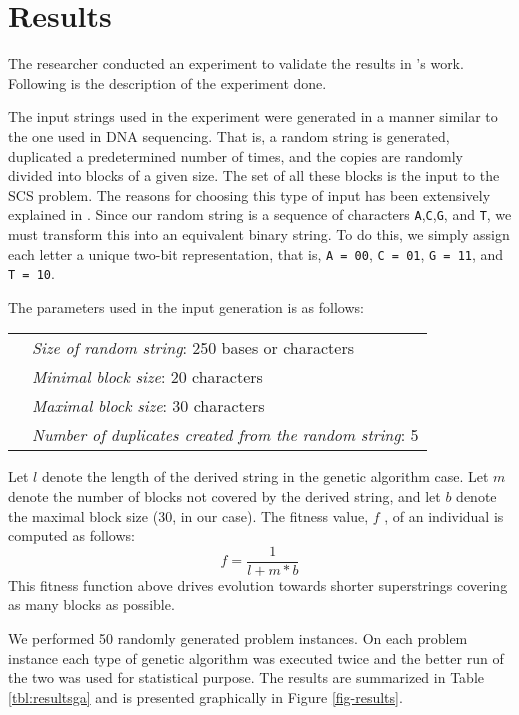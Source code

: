\chapter{Results}

The researcher conducted an experiment to validate the results
in \cite{Zaritsky2004}'s work. Following is the description of the 
experiment done.

The input strings used in the experiment were generated in a
 manner similar to the one used in DNA sequencing. That is, a random
string is generated, duplicated a predetermined number of times,
 and the copies are randomly divided into blocks of a given size. 
 The set of all these blocks is the input to the SCS problem. 
 The reasons for choosing this type of input has been extensively
 explained in \cite{Zaritsky2004}.
Since our random string is a sequence of characters \texttt{A},\texttt{C},\texttt{G}, and \texttt{T}, we must 
transform this into an equivalent binary string. To do this, we simply 
assign each letter a unique two-bit representation, that is, 
\texttt{A = 00}, \texttt{C = 01}, \texttt{G = 11}, and \texttt{T = 10}. 

The parameters used in the input generation is as follows:

\begin{tabular}{p{0.5cm}l}
&\textit{Size of random string}: 250 bases or characters\\
&\textit{Minimal block size}: 20 characters\\
&\textit{Maximal block size}: 30 characters\\
&\textit{Number of duplicates created from the random string}: 5\\
\end{tabular}

Let $l$ denote the length of the derived string in the
genetic algorithm case. Let $m$
denote the number of blocks not covered by the derived string, 
and let $b$ denote the maximal block size
(30, in our case). The fitness value, $f$ , of an individual
is computed as follows:
\[f = \dfrac{1}{l + m*b}\] 
This fitness function above drives evolution towards
shorter superstrings covering as many blocks as possible.

We performed 50 randomly generated problem instances.
On each problem instance each type of genetic algorithm was executed
twice and the better run of the two was used for statistical purpose.
The results are summarized in Table \ref{tbl:resultsga} and is presented graphically in Figure \ref{fig-results}.


